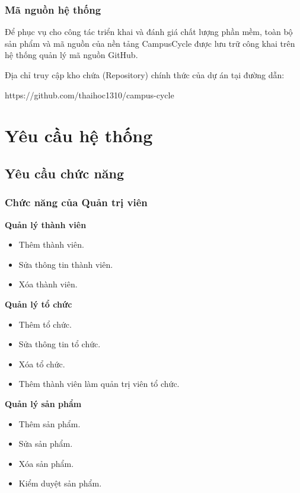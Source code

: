 \documentclass[12pt,a4paper]{report}
\begin{document}
\subsection{Mã nguồn hệ thống}

Để phục vụ cho công tác triển khai và đánh giá chất lượng phần mềm, toàn
bộ sản phẩm và mã nguồn của nền tảng CampusCycle được lưu trữ công khai trên
hệ thống quản lý mã nguồn GitHub.

Địa chỉ truy cập kho chứa (Repository) chính thức của dự án tại đường dẫn:

https://github.com/thaihoc1310/campus-cycle

\FloatBarrier
\clearpage

\chapter{Yêu cầu hệ thống}

\section{Yêu cầu chức năng}

\subsection{Chức năng của Quản trị viên}

\textbf{Quản lý thành viên}
\begin{itemize}[label=--, leftmargin=1.2cm]
\item Thêm thành viên.
\item Sửa thông tin thành viên.
\item Xóa thành viên.
\end{itemize}

\textbf{Quản lý tổ chức}
\begin{itemize}[label=--, leftmargin=1.2cm]
\item Thêm tổ chức.
\item Sửa thông tin tổ chức.
\item Xóa tổ chức.
\item Thêm thành viên làm quản trị viên tổ chức.
\end{itemize}

\textbf{Quản lý sản phẩm}
\begin{itemize}[label=--, leftmargin=1.2cm]
\item Thêm sản phẩm.
\item Sửa sản phẩm.
\item Xóa sản phẩm.
\item Kiểm duyệt sản phẩm.
\end{itemize}
\end{document}
